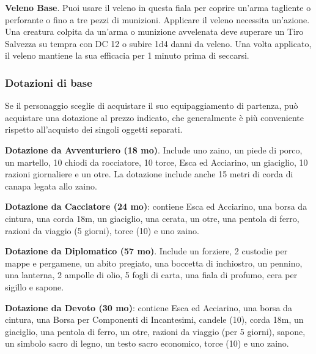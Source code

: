 \begin{multicols}{2}
\textbf{Veleno Base}\label{Veleno Base}. Puoi usare il veleno in questa fiala per coprire un'arma tagliente o perforante o fino a tre pezzi di munizioni. Applicare il veleno necessita un'azione. Una creatura colpita da un'arma o munizione avvelenata deve superare un Tiro Salvezza su tempra con DC 12 o subire 1d4 danni da veleno.
Una volta applicato, il veleno mantiene la sua efficacia per 1 minuto prima di seccarsi.

\subsubsection{Dotazioni di base}\hypertarget{Dotazioni di base}{}
Se il personaggio sceglie di acquistare il suo equipaggiamento di partenza, può acquistare una dotazione al prezzo indicato, che generalmente è più conveniente rispetto all'acquisto dei singoli oggetti separati.

\textbf{Dotazione da Avventuriero (18 mo)}. Include uno zaino, un piede di porco, un martello, 10 chiodi da rocciatore, 10 torce, Esca ed Acciarino, un giaciglio, 10 razioni giornaliere e un otre. La dotazione include anche 15 metri di corda di canapa legata allo zaino.

\textbf{Dotazione da Cacciatore (24 mo)}: contiene Esca ed Acciarino, una borsa da cintura, una corda 18m, un giaciglio, una cerata, un otre, una pentola di ferro, razioni da viaggio (5 giorni), torce (10) e uno zaino.

\textbf{Dotazione da Diplomatico (57 mo)}. Include un forziere, 2 custodie per mappe e pergamene, un abito pregiato, una boccetta di inchiostro, un pennino, una lanterna, 2 ampolle di olio, 5 fogli di carta, una fiala di profumo, cera per sigillo e sapone.

\textbf{Dotazione da Devoto (30 mo)}: contiene Esca ed Acciarino, una borsa da cintura, una Borsa per Componenti di Incantesimi, candele (10), corda 18m, un giaciglio, una pentola di ferro, un otre, razioni da viaggio (per 5 giorni), sapone, un simbolo sacro di legno, un testo sacro economico, torce (10) e uno zaino.



\end{multicols}
